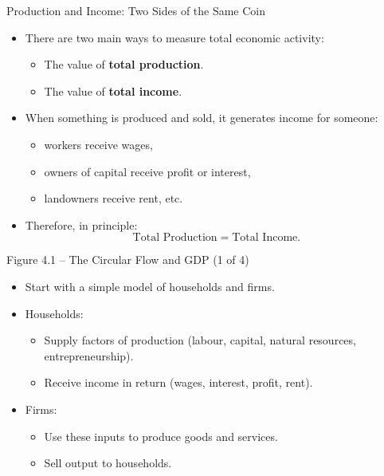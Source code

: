 \documentclass[aspectratio=169]{beamer}
\begin{document}
\begin{frame}{Production and Income: Two Sides of the Same Coin}
\transfade
\begin{itemize}
  \item There are two main ways to measure total economic activity:
  \begin{itemize}
    \item The value of \textbf{total production}.
    \item The value of \textbf{total income}.
  \end{itemize}
  \item When something is produced and sold, it generates \alert{income} for someone:
  \begin{itemize}
    \item workers receive wages,
    \item owners of capital receive profit or interest,
    \item landowners receive rent, etc.
  \end{itemize}
  \item Therefore, in principle:  
  \[
    \text{Total Production} = \text{Total Income}.
  \]
\end{itemize}
\end{frame}


\begin{frame}{Figure 4.1 -- The Circular Flow and GDP (1 of 4)}
\transfade
\begin{itemize}
  \item Start with a simple model of households and firms.
  \item Households:
  \begin{itemize}
    \item Supply factors of production (labour, capital, natural resources, entrepreneurship).
    \item Receive income in return (wages, interest, profit, rent).
  \end{itemize}
  \item Firms:
  \begin{itemize}
    \item Use these inputs to produce goods and services.
    \item Sell output to households.
  \end{itemize}
\end{itemize}
\end{frame}
\end{document}
